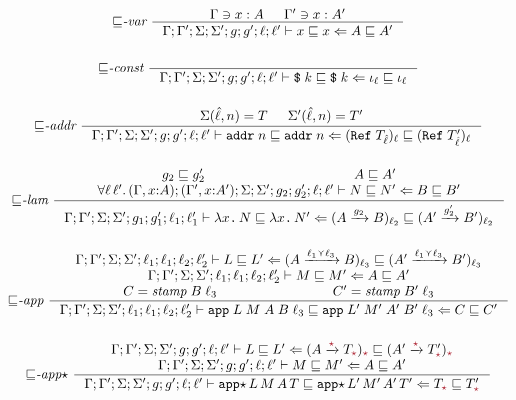 \begin{figure}[tbp]
\raggedright
  {\small
  \begin{gather*}
  {\sqsubseteq}\textit{-var}~
  \inference{\Gamma \ni x : A & \Gamma' \ni x : A'}
            {\precctx{\Gamma}{\Gamma'}{\Sigma}{\Sigma'}{g}{g'}{\ell}{\ell'}\ccprec{x}{x}{A}{A'}}
  \\[3ex]
  {\sqsubseteq}\textit{-const}~
  \inference{}
            {\precctx{\Gamma}{\Gamma'}{\Sigma}{\Sigma'}{g}{g'}{\ell}{\ell'}\ccprec{\ccconst{k}}{\ccconst{k}}{\iota_{\ell}}{\iota_{\ell}}}
  \\[3ex]
  {\sqsubseteq}\textit{-addr}~
  \inference{\Sigma(\hat{\ell}, n) = T & \Sigma'(\hat{\ell}, n) = T'}
  {\precctx{\Gamma}{\Gamma'}{\Sigma}{\Sigma'}{g}{g'}{\ell}{\ell'}\ccprec{\ccaddr{n}}{\ccaddr{n}}{(\Refer{T_{\hat{\ell}}})_\ell}{(\Refer{T'_{\hat{\ell}}})_\ell}}
  \\[3ex]
    {\sqsubseteq}\textit{-lam}~
    \inference{g_2 \sqsubseteq g_2' & A \sqsubseteq A' \\
               \forall \ell\,\ell'.\, \precctx{(\Gamma,x{:}A)}{(\Gamma',x{:}A')}{\Sigma}{\Sigma'}{g_2}{g_2'}{\ell}{\ell'}\ccprec{N}{N'}{B}{B'}}
              {\precctx{\Gamma}{\Gamma'}{\Sigma}{\Sigma'}{g_1}{g_1'}{\ell_1}{\ell_1'}\ccprec{\cclam{x}{N}}{\cclam{x}{N'}}{(\Fun{A}{g_2}{B})_{\ell_2}}{(\Fun{A'}{g_2'}{B'})_{\ell_2}}}
  \\[3ex]
    {\sqsubseteq}\textit{-app}~
    \inference{\precctx{\Gamma}{\Gamma'}{\Sigma}{\Sigma'}{\ell_1}{\ell_1}{\ell_2}{\ell_2'}\ccprec{L}{L'}{(\Fun{A}{\ell_1 \curlyvee \ell_3}{B})_{\ell_3}}{(\Fun{A'}{\ell_1 \curlyvee \ell_3}{B'})_{\ell_3}} \\
    \precctx{\Gamma}{\Gamma'}{\Sigma}{\Sigma'}{\ell_1}{\ell_1}{\ell_2}{\ell_2'}\ccprec{M}{M'}{A}{A'} \\
    C = \mathit{stamp}\;B\;\ell_3 & C' = \mathit{stamp}\;B'\;\ell_3}
              {\precctx{\Gamma}{\Gamma'}{\Sigma}{\Sigma'}{\ell_1}{\ell_1}{\ell_2}{\ell_2'}\ccprec{\ccapp{L}{M}{A}{B}{\ell_3}}{\ccapp{L'}{M'}{A'}{B'}{\ell_3}}{C}{C'}}
  \\[3ex]
  {\sqsubseteq}\textit{-app}{\star}~
    \inference{\precctx{\Gamma}{\Gamma'}{\Sigma}{\Sigma'}{g}{g'}{\ell}{\ell'}\ccprec{L}{L'}{(\Fun{A}{\unk}{T_{\unk}})_{\unk}}{(\Fun{A'}{\unk}{T'_{\unk}})_{\unk}} \\
      \precctx{\Gamma}{\Gamma'}{\Sigma}{\Sigma'}{g}{g'}{\ell}{\ell'}\ccprec{M}{M'}{A}{A'}}
              {\precctx{\Gamma}{\Gamma'}{\Sigma}{\Sigma'}{g}{g'}{\ell}{\ell'}\ccprec{\ccappstar{L}{M}{A}{T}}{\ccappstar{L'}{M'}{A'}{T'}}{T_{\unk}}{T'_{\unk}}}

\end{gather*}}
\end{figure}
